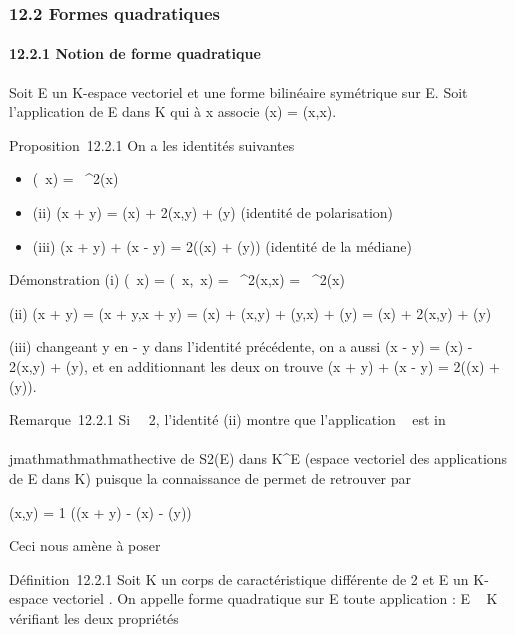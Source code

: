 
\subsubsection{12.2 Formes quadratiques}

\paragraph{12.2.1 Notion de forme quadratique}

Soit E un K-espace vectoriel et \phi une forme bilinéaire symétrique sur E.
Soit \Phi l'application de E dans K qui à x associe \Phi(x) = \phi(x,x).

Proposition~12.2.1 On a les identités suivantes

\begin{itemize}
\itemsep1pt\parskip0pt
\item \Phi(\lambda~x) = \lambda~^2\Phi(x)
\item
  (ii) \Phi(x + y) = \Phi(x) + 2\phi(x,y) + \Phi(y) (identité de polarisation)
\item
  (iii) \Phi(x + y) + \Phi(x - y) = 2(\Phi(x) + \Phi(y)) (identité de la médiane)
\end{itemize}

Démonstration (i) \Phi(\lambda~x) = \phi(\lambda~x,\lambda~x) = \lambda~^2\phi(x,x) =
\lambda~^2\Phi(x)

(ii) \Phi(x + y) = \phi(x + y,x + y) = \Phi(x) + \phi(x,y) + \phi(y,x) + \Phi(y) = \Phi(x) +
2\phi(x,y) + \Phi(y)

(iii) changeant y en - y dans l'identité précédente, on a aussi \Phi(x - y)
= \Phi(x) - 2\phi(x,y) + \Phi(y), et en additionnant les deux on trouve \Phi(x + y)
+ \Phi(x - y) = 2(\Phi(x) + \Phi(y)).

Remarque~12.2.1 Si
\mathrmcarK\mathrel\neq~~2,
l'identité (ii) montre que l'application \phi\mapsto~\Phi
est in\\\\jmathmathmathmathective de S2(E) dans K^E (espace vectoriel
des applications de E dans K) puisque la connaissance de \Phi permet de
retrouver \phi par

\phi(x,y) = 1  (\Phi(x + y) - \Phi(x) - \Phi(y))

Ceci nous amène à poser

Définition~12.2.1 Soit K un corps de caractéristique différente de 2 et
E un K-espace vectoriel . On appelle forme quadratique sur E toute
application \Phi : E \rightarrow~ K vérifiant les deux propriétés


